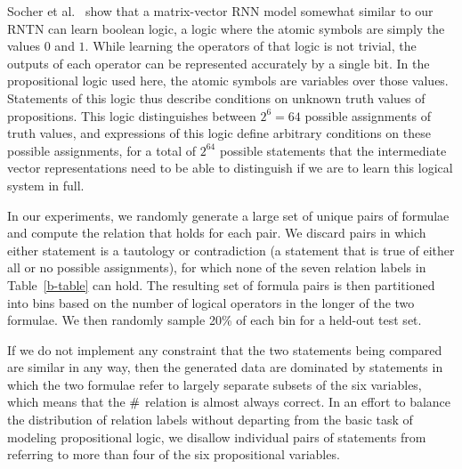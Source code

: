 Socher et al.~ show that a matrix-vector RNN
model somewhat similar to our RNTN can learn boolean logic, 
a logic where the atomic symbols are simply the
values $0$ and $1$. While learning the operators of that logic is not trivial, the outputs of
each operator can be represented accurately by a single bit.
In the propositional logic used here, the atomic symbols are variables over those values. 
Statements of this logic thus describe conditions on
unknown truth values of propositions. This logic distinguishes
between $2^{6} = 64$ possible assignments of truth values, and
expressions of this logic define arbitrary conditions on these
possible assignments, for a total of $2^{64}$ %
possible statements that the intermediate vector representations need
to be able to distinguish if we are to learn this logical system in full.

In our experiments, we randomly generate a large set of unique pairs 
of formulae and compute the relation that holds for each pair.
We discard pairs in which either statement is a tautology or
contradiction (a statement that is true of either all or no possible
assignments), for which none of the seven relation labels in
Table~\ref{b-table} can hold. The resulting set of formula pairs is
then partitioned into bins based on the number of logical operators in
the longer of the two formulae. We then randomly sample 20\% of each
bin for a held-out test set.

If we do not implement any constraint that the two statements being
compared are similar in any way, then the generated data are dominated
by statements in which the two formulae refer to largely separate
subsets of the six variables, which means that the $\mathbin{\#}$ relation
is almost always correct.  In an effort to balance the distribution of
relation labels without departing from the basic task of modeling
propositional logic, we disallow individual pairs of statements from
referring to more than four of the six propositional variables.

